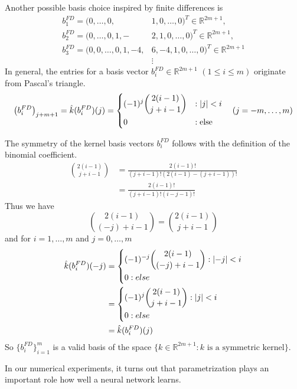 \documentclass[twoside,a4paper]{article}
\begin{document}
Another possible basis choice inspired by finite differences is
\begin{align*}
	b_1^{FD} = (0, \dots, 0,& 1,0, \dots, 0)^T \in \mathbb{R}^{2m+1},\\
	b_2^{FD} = (0, \dots, 0, 1,-&2,1, 0, \dots, 0)^T \in \mathbb{R}^{2m+1},\\
	b_3^{FD} = (0, 0, \dots, 0, 1,-4,& 6,-4,1, 0, \dots, 0)^T \in \mathbb{R}^{2m+1} \\
	&\vdots
\end{align*}
In general, the entries for a basis vector $b_i^{FD} \in \mathbb{R}^{2m+1}$ $(1 \leq i \leq m)$ 
originate from Pascal's triangle.
\begin{equation*}
	\left( b_i^{FD} \right)_{j+m+1} = \hat{k}(b_i^{FD})(j) = \begin{dcases}
		(-1)^j \binom{2(i-1)}{j+i-1} &: \left|{j}\right| < i \\
		0 &: \text{else}
	\end{dcases}
	\quad (j=-m, \dots, m)
\end{equation*}

The symmetry of the kernel basis vectors $b_i^{FD}$ follows with the definition of the binomial coefficient.
\begin{align*}
	\binom{2(i-1)}{j+i-1} &= \frac{2(i-1)!}{(j+i-1)!(2(i-1)-(j+i-1))!} \\
	&= \frac{2(i-1)!}{(j+i-1)!(i-j-1)!}
\end{align*}
Thus we have
\begin{equation*}
	\binom{2(i-1)}{(-j)+i-1} = \binom{2(i-1)}{j+i-1}
\end{equation*}
and for $i=1, \dots, m$ and $j= 0, \dots, m$
\begin{align*}
	\hat{k}(b_i^{FD})(-j) &= \begin{dcases}
		(-1)^{-j} \binom{2(i-1)}{(-j)+i-1} : \left|{-j}\right| < i \\
		0 : else
	\end{dcases} \\
	&= \begin{dcases}
		(-1)^{j} \binom{2(i-1)}{j+i-1} : \left|{j}\right| < i \\
		0 : else
	\end{dcases} \\
	&= \hat{k}(b_i^{FD})(j) 
\end{align*}
So $\{ b_i^{FD} \}_{i=1}^m$ is a valid basis of
the space $\{ k \in \mathbb{R}^{2m+1} : k \text{ is a symmetric kernel} \}$.

In our numerical experiments, it turns out that
parametrization plays an important role how well a neural network learns.
\end{document}
